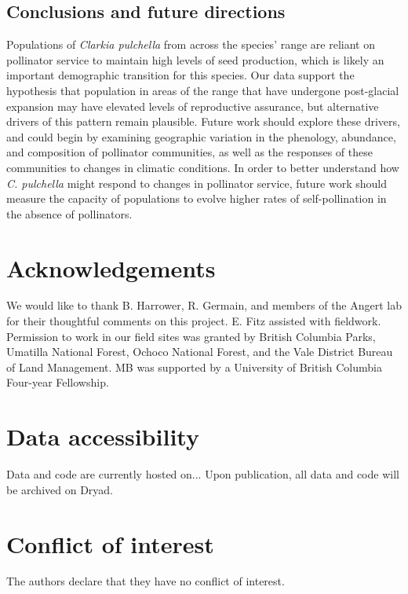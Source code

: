 \documentclass{article}
\begin{document}
\subsection*{Conclusions and future directions}
Populations of \textit{Clarkia pulchella} from across the species' range are reliant on pollinator service to maintain high levels of seed production, which is likely an important demographic transition for this species. Our data support the hypothesis that population in areas of the range that have undergone post-glacial expansion may have elevated levels of reproductive assurance, but alternative drivers of this pattern remain plausible. Future work should explore these drivers, and could begin by examining geographic variation in the phenology, abundance, and composition of pollinator communities, as well as the responses of these communities to changes in climatic conditions. In order to better understand how \textit{C. pulchella} might respond to changes in pollinator service, future work should measure the capacity of populations to evolve higher rates of self-pollination in the absence of pollinators. 

\section*{Acknowledgements}
We would like to thank B. Harrower, R. Germain, and members of the Angert lab for their thoughtful comments on this project. E. Fitz assisted with fieldwork. Permission to work in our field sites was granted by British Columbia Parks, Umatilla National Forest, Ochoco National Forest, and the Vale District Bureau of Land Management. MB was supported by a University of British Columbia Four-year Fellowship.

\section*{Data accessibility}
Data and code are currently hosted on... Upon publication, all data and code will be archived on Dryad.

\section*{Conflict of interest} 
The authors declare that they have no conflict of interest.




\clearpage
\end{document}
